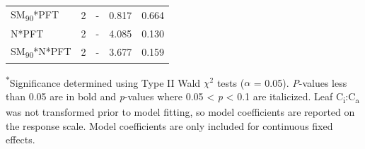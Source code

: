 \begin{table}
\begin{tabular}{p{6cm}p{0.5cm}p{2cm}p{1.5cm}p{1.5cm}}
            SM\textsubscript{90}*PFT
            & \multicolumn{1}{r}{2}
            & \multicolumn{1}{r}{-}
            & \multicolumn{1}{r}{0.817}
            & \multicolumn{1}{r}{0.664}
            \\

            N*PFT
            & \multicolumn{1}{r}{2}
            & \multicolumn{1}{r}{-}
            & \multicolumn{1}{r}{4.085}
            & \multicolumn{1}{r}{0.130}
            \\

            SM\textsubscript{90}*N*PFT
            & \multicolumn{1}{r}{2}
            & \multicolumn{1}{r}{-}
            & \multicolumn{1}{r}{3.677}
            & \multicolumn{1}{r}{0.159}
            \\
            \hline
        \end{tabular}%
    \label{tab:table4.3}
\end{table}
\noindent \textsuperscript{$*$}Significance determined using Type II Wald $\chi^{2}$ tests ($\alpha$ = 0.05). \textit{P}-values less than 0.05 are in bold and \textit{p}-values where 0.05 < \textit{p} < 0.1 are italicized. Leaf C\textsubscript{i}:C\textsubscript{a} was not transformed prior to model fitting, so model coefficients are reported on the response scale. Model coefficients are only included for continuous fixed effects.
\clearpage

